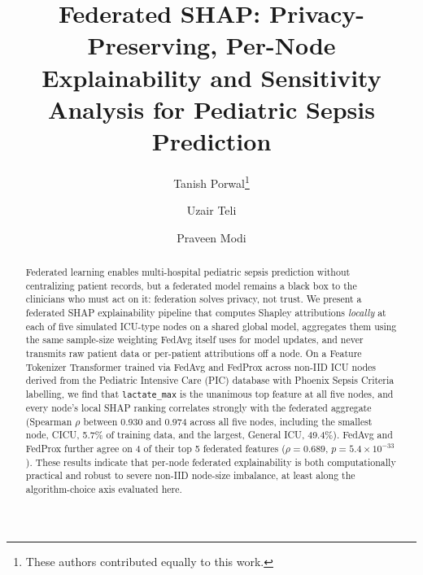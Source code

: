 \documentclass{svproc}
\begin{document}
\mainmatter

\title{Federated SHAP: Privacy-Preserving, Per-Node Explainability and Sensitivity Analysis for Pediatric Sepsis Prediction}


\author{Tanish Porwal\thanks{These authors contributed equally to this work.} \and Uzair Teli\footnotemark[1] \and Praveen Modi}




\maketitle

\begin{abstract}
Federated learning enables multi-hospital pediatric sepsis prediction without centralizing patient records, but a federated model remains a black box to the clinicians who must act on it: federation solves privacy, not trust. We present a federated SHAP explainability pipeline that computes Shapley attributions \emph{locally} at each of five simulated ICU-type nodes on a shared global model, aggregates them using the same sample-size weighting FedAvg itself uses for model updates, and never transmits raw patient data or per-patient attributions off a node. On a Feature Tokenizer Transformer trained via FedAvg and FedProx across non-IID ICU nodes derived from the Pediatric Intensive Care (PIC) database with Phoenix Sepsis Criteria labelling, we find that \texttt{lactate\_max} is the unanimous top feature at all five nodes, and every node's local SHAP ranking correlates strongly with the federated aggregate (Spearman $\rho$ between 0.930 and 0.974 across all five nodes, including the smallest node, CICU, 5.7\% of training data, and the largest, General ICU, 49.4\%). FedAvg and FedProx further agree on 4 of their top 5 federated features ($\rho = 0.689$, $p = 5.4\times10^{-33}$). These results indicate that per-node federated explainability is both computationally practical and robust to severe non-IID node-size imbalance, at least along the algorithm-choice axis evaluated here.
\end{abstract}
\end{document}
